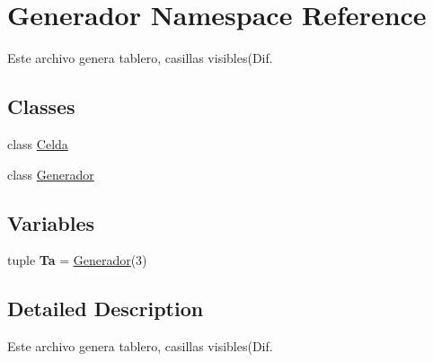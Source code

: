 \hypertarget{namespace_generador}{\section{Generador Namespace Reference}
\label{namespace_generador}
}


Este archivo genera tablero, casillas visibles(Dif.  


\subsection*{Classes}
\begin{DoxyCompactItemize}
\item 
class \hyperlink{class_generador_1_1_celda}{Celda}
\item 
class \hyperlink{class_generador_1_1_generador}{Generador}
\end{DoxyCompactItemize}
\subsection*{Variables}
\begin{DoxyCompactItemize}
\item 
\hypertarget{namespace_generador_a8cbdae695491da450934c4369caf8d29}{tuple {\bfseries Ta} = \hyperlink{class_generador_1_1_generador}{Generador}(3)}\label{namespace_generador_a8cbdae695491da450934c4369caf8d29}

\end{DoxyCompactItemize}


\subsection{Detailed Description}
Este archivo genera tablero, casillas visibles(Dif. 